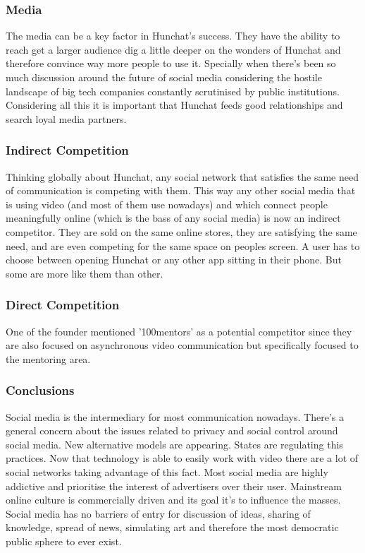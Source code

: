 \documentclass[12pt]{article}
\begin{document}
	\subsubsection{Media}
	The media can be a key factor in Hunchat's success. They have the ability to reach get a larger audience dig a little deeper on the wonders of Hunchat and therefore convince way more people to use it. Specially when there's been so much discussion around the future of social media considering the hostile landscape of big tech companies constantly scrutinised by public institutions. Considering all this it is important that Hunchat feeds good relationships and search loyal media partners. 
		
	\subsubsection{Indirect Competition}
	Thinking globally about Hunchat, any social network that satisfies the same need of communication is competing with them. This way any other social media that is using video (and most of them use nowadays) and which connect people meaningfully online (which is the bass of any social media) is now an indirect competitor. They are sold on the same online stores, they are satisfying the same need, and are even competing for the same space on peoples screen. A user has to choose between opening Hunchat or any other app sitting in their phone. But some are more like them than other.
	
	\subsubsection{Direct Competition}
	One of the founder mentioned '100mentors' as a potential competitor since they are also focused on asynchronous video communication but specifically focused to the mentoring area. 
	
	\subsubsection{Conclusions}
	Social media is the intermediary for most communication nowadays. There's a general concern about the issues related to privacy and social control around social media. New alternative models are appearing. States are regulating this practices. Now that technology is able to easily work with video there are a lot of social networks taking advantage of this fact. Most social media are highly addictive and prioritise the interest of advertisers over their user. Mainstream online culture is commercially driven and its goal it's to influence the masses. Social media has no barriers of entry for discussion of ideas, sharing of knowledge, spread of news, simulating art and therefore the most democratic public sphere to ever exist.
\end{document}
